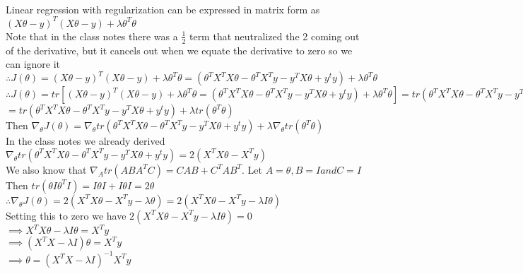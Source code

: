 \begin{answer}\\
Linear regression with regularization can be expressed in matrix form as \\
$(X\theta-y)^T (X\theta-y)+\lambda \theta^T \theta$\\
Note that in the class notes there was a $\frac{1}{2}$ term that neutralized the 2 coming out of the derivative, but it cancels out when we equate the derivative to zero so we can ignore it\\
$\therefore J(\theta)=(X\theta-y)^T (X\theta-y)+\lambda \theta^T \theta=(\theta^TX^TX \theta-\theta^TX^Ty -y^TX\theta+y^ty) + \lambda \theta^T \theta$\\
$\therefore J(\theta)=tr \left [(X\theta-y)^T (X\theta-y)+\lambda \theta^T \theta=(\theta^TX^TX \theta-\theta^TX^Ty -y^TX\theta+y^ty) + \lambda \theta^T \theta \right ]=tr(\theta^TX^TX \theta-\theta^TX^Ty -y^TX\theta+y^ty) + tr(\lambda \theta^T \theta)$\\
$=tr(\theta^TX^TX \theta-\theta^TX^Ty -y^TX\theta+y^ty) + \lambda tr(\theta^T \theta)$\\
Then $\nabla_{\theta}J(\theta)=\nabla_{\theta}tr(\theta^TX^TX \theta-\theta^TX^Ty -y^TX\theta+y^ty)+\lambda \nabla_{\theta} tr(\theta^T \theta)$\\
In the class notes we already derived $\nabla_{\theta}tr(\theta^TX^TX \theta-\theta^TX^Ty -y^TX\theta+y^ty) = 2(X^TX\theta - X^Ty)$\\
We also know that $\nabla_{A} tr(ABA^TC)=CAB+C^TAB^T$. Let $A=\theta, B=I and C=I$\\
Then $tr(\theta I \theta^T I)=I \theta I+ I \theta I = 2 \theta$\\
$\therefore \nabla_{\theta}J(\theta)=2(X^TX\theta - X^Ty - \lambda \theta)=2(X^TX\theta - X^Ty - \lambda I \theta)$\\
Setting this to zero we have
$2(X^TX\theta - X^Ty - \lambda I \theta)=0$\\
$\implies X^TX\theta  - \lambda I \theta= X^Ty$\\
$\implies (X^TX-\lambda I) \theta=X^Ty$\\
$\implies \theta=(X^TX-\lambda I)^{-1}X^Ty$\\
\end{answer}
